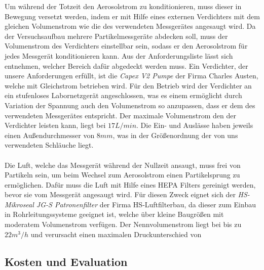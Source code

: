 Um während der Totzeit den Aerosolstrom zu konditionieren, muss dieser in Bewegung versetzt werden, indem er mit Hilfe eines externen Verdichters mit dem gleichen Volumenstrom wie die des verwendeten Messgerätes angesaugt wird. Da der Versuchsaufbau mehrere Partikelmessgeräte abdecken soll, muss der Volumenstrom des Verdichters einstellbar sein, sodass er den Aerosolstrom für jedes Messgerät konditionieren kann. Aus der Anforderungsliste lässt sich entnehmen, welcher Bereich dafür abgedeckt werden muss. Ein Verdichter, der unsere Anforderungen erfüllt, ist die \textit{Capex V2 Pumpe} der Firma Charles Austen, welche mit Gleichstrom betrieben wird. Für den Betrieb wird der Verdichter an ein stufenloses Labornetzgerät angeschlossen, was es einem ermöglicht durch Variation der Spannung auch den Volumenstrom so anzupassen, dass er dem des verwendeten Messgerätes entspricht. Der maximale Volumenstrom den der Verdichter leisten kann, liegt bei \(17 L/min\). Die Ein- und Auslässe haben jeweils einen Außendurchmesser von \(8mm\), was in der Größenordnung der von uns verwendeten Schläuche liegt.
\\\\
Die Luft, welche das Messgerät während der Nullzeit ansaugt, muss frei von Partikeln sein, um beim Wechsel zum Aerosolstrom einen Partikelsprung zu ermöglichen. Dafür muss die Luft mit Hilfe eines HEPA Filters gereinigt werden, bevor sie vom Messgerät angesaugt wird. Für diesen Zweck eignet sich der \textit{HS-Mikroseal JG-S Patronenfilter} der Firma HS-Luftfilterbau, da dieser zum Einbau in Rohrleitungssysteme geeignet ist, welche über kleine Baugrößen mit moderatem Volumenstrom verfügen. Der Nennvolumenstrom liegt bei bis zu \(22m^3 / h\) und verursacht einen maximalen Druckunterschied von 

\subsection{Kosten und Evaluation}